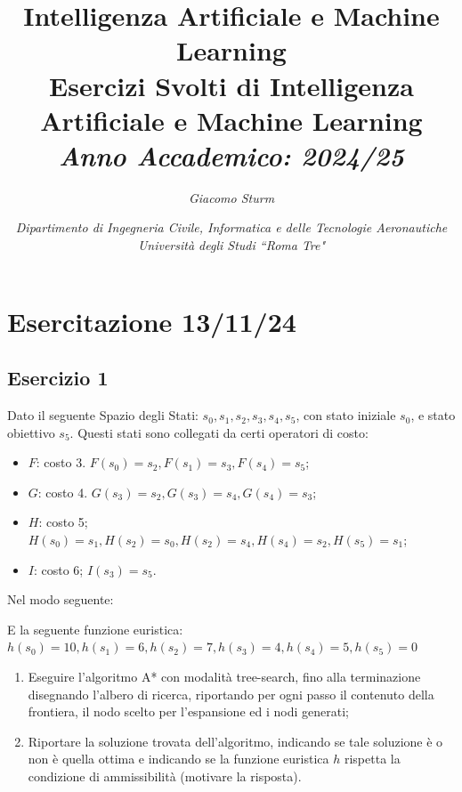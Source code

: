\documentclass{article}
\numberwithin{equation}{subsection}
\begin{document}
\title{%
    \textbf{Intelligenza Artificiale e Machine Learning}  \\ 
    \large Esercizi Svolti di Intelligenza Artificiale e Machine Learning \\
    \textit{Anno Accademico: 2024/25}}
\author{\textit{Giacomo Sturm}}
\date{\textit{Dipartimento di Ingegneria Civile, Informatica e delle Tecnologie Aeronautiche \\
Università degli Studi ``Roma Tre"}}

\maketitle
\thispagestyle{link}

\clearpage


\pagestyle{fancy}
\fancyhead{}\fancyfoot{}
\fancyfoot[C]{\thepage}

\tableofcontents

\clearpage
{}

\section{Esercitazione 13/11/24}

\subsection*{Esercizio 1}

Dato il seguente Spazio degli Stati: $s_0,s_1,s_2,s_3,s_4,s_5$, con stato iniziale $s_0$, e stato obiettivo $s_5$. 
Questi stati sono collegati da certi operatori di costo:
\begin{itemize}
    \item $F$: costo 3. $F(s_0)=s_2, F(s_1)=s_3, F(s_4)=s_5$;
    \item $G$: costo 4. $G(s_3)=s_2, G(s_3)=s_4, G(s_4)=s_3$;
    \item $H$: costo 5; $H(s_0)=s_1, H(s_2)=s_0, H(s_2)=s_4, H(s_4)=s_2, H(s_5)=s_1$;
    \item $I$: costo 6; $I(s_3)=s_5$.
\end{itemize}
Nel modo seguente: 

E la seguente funzione euristica: $h(s_0)=10,h(s_1)=6,h(s_2)=7,h(s_3)=4,h(s_4)=5,h(s_5)=0$


\begin{enumerate}
    \item Eseguire l'algoritmo A* con modalità tree-search, fino alla terminazione disegnando l'albero di ricerca, riportando per ogni passo il 
contenuto della frontiera, il nodo scelto per l'espansione ed i nodi generati;
    \item Riportare la soluzione trovata dell'algoritmo, indicando se tale soluzione è o non è quella ottima e indicando se la funzione euristica 
$h$ rispetta la condizione di ammissibilità (motivare la risposta). 
\end{enumerate}
\end{document}

